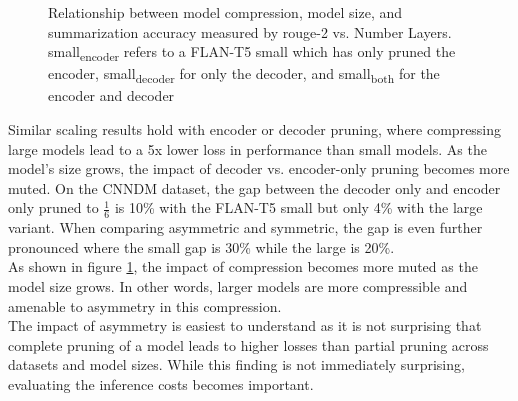 \begin{figure}
    \caption{Relationship between model compression, model size, and summarization accuracy measured by rouge-2 vs. Number Layers. small\textsubscript{encoder} refers to a FLAN-T5 small which has only pruned the encoder, small\textsubscript{decoder} for only the decoder, and small\textsubscript{both} for the encoder and decoder}
    \label{fig:scale-laws-pruning}
\end{figure}
Similar scaling results hold with encoder or decoder pruning, where compressing large models lead to a 5x lower loss in performance than small models. As the model's size grows, the impact of decoder vs. encoder-only pruning becomes more muted. On the CNNDM dataset, the gap between the decoder only and encoder only pruned to $\frac{1}{6}$ is 10\% with the FLAN-T5 small but only 4\% with the large variant. When comparing asymmetric and symmetric, the gap is even further pronounced where the small gap is 30\% while the large is 20\%. \\
As shown in figure \ref{fig:scale-laws-pruning}, the impact of compression becomes more muted as the model size grows. In other words, larger models are more compressible and amenable to asymmetry in this compression. \\
The impact of asymmetry is easiest to understand as it is not surprising that complete pruning of a model leads to higher losses than partial pruning across datasets and model sizes. While this finding is not immediately surprising, evaluating the inference costs becomes important. \\

